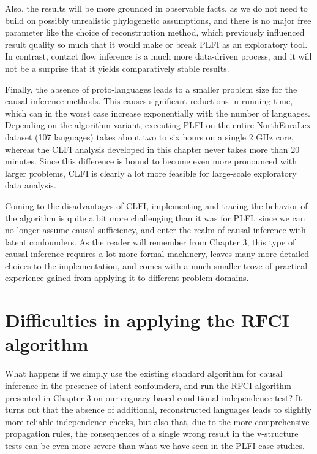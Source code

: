 Also, the results will be more grounded in observable facts, as we do not need to build on possibly unrealistic phylogenetic assumptions, and there is no major free parameter like the choice of reconstruction method, which previously influenced result quality so much that it would make or break PLFI as an exploratory tool. In contrast, contact flow inference is a much more data-driven process, and it will not be a surprise that it yields comparatively stable results.

Finally, the absence of proto-languages leads to a smaller problem size for the causal inference methods. This causes significant reductions in running time, which can in the worst case increase exponentially with the number of languages. Depending on the algorithm variant, executing PLFI on the entire NorthEuraLex dataset (107 languages) takes about two to six hours on a single 2 GHz core, whereas the CLFI analysis developed in this chapter never takes more than 20 minutes. Since this difference is bound to become even more pronounced with larger problems, CLFI is clearly a lot more feasible for large-scale exploratory data analysis.

Coming to the disadvantages of CLFI, implementing and tracing the behavior of the algorithm is quite a bit more challenging than it was for PLFI, since we can no longer assume causal sufficiency, and enter the realm of causal inference with latent confounders. As the reader will remember from Chapter 3, this type of causal inference requires a lot more formal machinery, leaves many more detailed choices to the implementation, and comes with a much smaller trove of practical experience gained from applying it to different problem domains.

\section{Difficulties in applying the RFCI algorithm}
What happens if we simply use the existing standard algorithm for causal inference in the presence of latent confounders, and run the RFCI algorithm presented in Chapter 3 on our cognacy-based conditional independence test? It turns out that the absence of additional, reconstructed languages leads to slightly more reliable independence checks, but also that, due to the more comprehensive propagation rules, the consequences of a single wrong result in the v-structure tests can be even more severe than what we have seen in the PLFI case studies.

